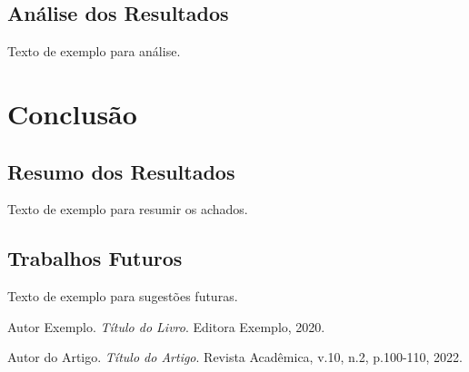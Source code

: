 \documentclass[12pt]{article}
\begin{document}
\subsection{Análise dos Resultados}
Texto de exemplo para análise.

\section{Conclusão}
\subsection{Resumo dos Resultados}
Texto de exemplo para resumir os achados.

\subsection{Trabalhos Futuros}
Texto de exemplo para sugestões futuras.

\begin{thebibliography}{9}

Autor Exemplo.
\textit{Título do Livro}.
Editora Exemplo, 2020.

Autor do Artigo.
\textit{Título do Artigo}.
Revista Acadêmica, v.10, n.2, p.100-110, 2022.

\end{thebibliography}
\end{document}
